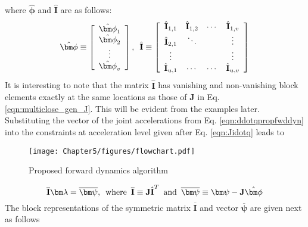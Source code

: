 {	where $\hat{\bm\phi}$ and $\hat{\textbf{I}}$ are as follows:
	\begin{equation}
	\label{eqn:c5_phicapIcap}
	\hat{\bm\phi} \equiv 
	\left[ \begin{array}{c}
	\hat{\bm\phi}_1\\
	\hat{\bm\phi}_2\\
	\vdots\\
	\hat{\bm\phi}_v\\
	\end{array} \right]
	, \hspace*{5pt}
	\hat{\textbf{I}} \equiv
	\left[ \begin{array}{cccc}
	\hat{\textbf{I}}_{1,1} & \hat{\textbf{I}}_{1,2} & \cdots & \hat{\textbf{I}}_{1,v} \\
	\hat{\textbf{I}}_{2,1} & \ddots & & \vdots \\
	\vdots & & & \vdots \\
	\hat{\textbf{I}}_{u,1} & \cdots & \cdots & \hat{\textbf{I}}_{u,v} \\
	\end{array} \right]
	\end{equation}
	It is interesting to note that the matrix $\hat{\textbf{I}}$ has vanishing and non-vanishing block elements exactly at the same locations as those of \textbf{J} in Eq. \ref{eqn:multiclose_gen_J}. This will be evident from the examples later. Substituting the vector of the joint accelerations from Eq. \ref{eqn:ddotqpropfwddyn} into the constraints at acceleration level given after Eq. \ref{eqn:Jidotq} leads to 
	\begin{figure}[t!]
		\begin{center}
			\texttt{[image: Chapter5/figures/flowchart.pdf]}
			\caption{Proposed forward dynamics algorithm}
			\label{fig:c5flowchart} %
		\end{center}
	\end{figure}
	\begin{equation}
	\label{eqn:Ibarlamdaeqn}
	\overline{\textbf{I}}\bm\lambda = \mbox{$\overline{\bm\psi}$},\hspace*{5pt} \mathrm{where} \hspace*{5pt}\overline{\textbf{I}} \equiv \textbf{J}\hat{\textbf{I}}^T \hspace*{5pt} \mathrm{and} \hspace*{5pt}\mbox{$\overline{\bm\psi}$} \equiv \bm\psi - \textbf{J}\hat{\bm\phi}
	\end{equation}
	The block representations of the symmetric matrix $\overline{\textbf{I}}$ and vector $\mbox{$\overline{\bm\psi}$}$ are given next as follows
}
